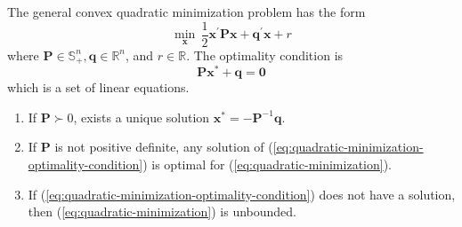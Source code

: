 \begin{example}
    The general convex quadratic minimization problem has the form
    \begin{equation}
        \min_{\mathbf{x}}\,\frac{1}{2}\mathbf{x}^{\prime}\mathbf{P}\mathbf{x}+\mathbf{q}^{\prime}\mathbf{x}+r \label{eq:quadratic-minimization}
    \end{equation}
    where $\mathbf{P}\in\mathbb{S}_{+}^{n},\mathbf{q}\in\mathbb{R}^{n}$, and $r\in\mathbb{R}$. The optimality condition is
    \begin{equation}
        \mathbf{P}\mathbf{x}^{*}+\mathbf{q}=\mathbf{0}
        \label{eq:quadratic-minimization-optimality-condition}
    \end{equation}
    which is a set of linear equations.
    \begin{enumerate}
        \item If $\mathbf{P}\succ 0$, exists a unique solution $\mathbf{x}^{*}=-\mathbf{P}^{-1}\mathbf{q}$.
        \item If $\mathbf{P}$ is not positive definite, any solution of (\ref{eq:quadratic-minimization-optimality-condition}) is optimal for (\ref{eq:quadratic-minimization}).
        \item If (\ref{eq:quadratic-minimization-optimality-condition}) does not have a solution, then (\ref{eq:quadratic-minimization}) is unbounded.
    \end{enumerate}
\end{example}

